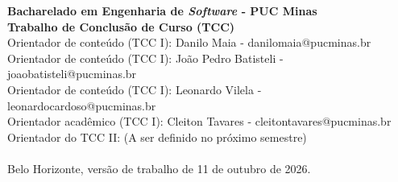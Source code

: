 \documentclass[12pt]{article}
\begin{document}
\begin{tcolorbox}
\footnotesize
\textbf{Bacharelado em Engenharia de \emph{Software} - PUC Minas\\
Trabalho de Conclusão de Curso (TCC)} \\

\indent Orientador de conteúdo (TCC I): Danilo Maia - danilomaia@pucminas.br \\
Orientador de conteúdo (TCC I): João Pedro Batisteli - joaobatisteli@pucminas.br\\
Orientador de conteúdo (TCC I): Leonardo Vilela - leonardocardoso@pucminas.br \\
Orientador acadêmico (TCC I): Cleiton Tavares - cleitontavares@pucminas.br \\
Orientador do TCC II: (A ser definido no próximo semestre)\\ \\
Belo Horizonte, versão de trabalho de 11 de outubro de 2026.
\end{tcolorbox}










\appendix

\end{document}
